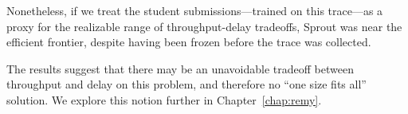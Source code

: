 Nonetheless, if we treat the student submissions---trained on this
trace---as a proxy for the realizable range of throughput-delay
tradeoffs, Sprout was near the efficient frontier, despite having been
frozen before the trace was collected.

The results suggest that there may be an unavoidable tradeoff between
throughput and delay on this problem, and therefore no ``one size fits
all'' solution. We explore this notion further in
Chapter~\ref{chap:remy}.
